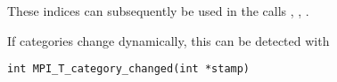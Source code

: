 \begin{raggedlist}
  These indices can subsequently be used in the calls
  ,
  ,
  .
\end{raggedlist}

If categories change dynamically, this can be detected with
\begin{lstlisting}
int MPI_T_category_changed(int *stamp)
\end{lstlisting}

